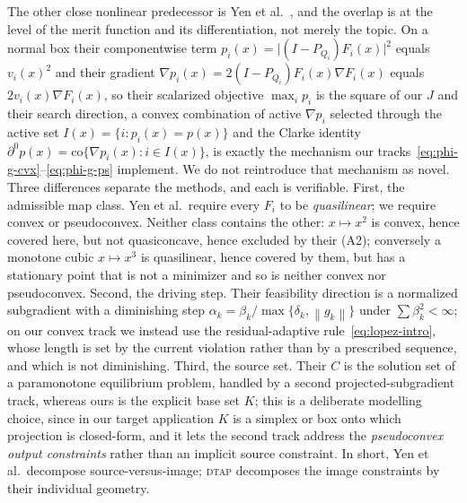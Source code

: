 \documentclass[]{interact}
\theoremstyle{plain}
\theoremstyle{definition}
\theoremstyle{remark}
\newcommand{\norm}[1]{\left\lVert #1 \right\rVert}
\newcommand{\dtap}{\textsc{dtap}}
\begin{document}
The other close nonlinear predecessor is Yen et al.~\citep{yen2019}, and the overlap is at the
level of the merit function and its differentiation, not merely the topic. On a normal box their
componentwise term $p_i(x)=\lvert(I-P_{Q_i})F_i(x)\rvert^2$ equals $v_i(x)^2$ and their gradient
$\nabla p_i(x)=2(I-P_{Q_i})F_i(x)\nabla F_i(x)$ equals $2v_i(x)\nabla F_i(x)$, so their scalarized
objective $\max_i p_i$ is the square of our $J$ and their search direction, a convex combination
of active $\nabla p_i$ selected through the active set $I(x)=\{i:p_i(x)=p(x)\}$ and the Clarke
identity $\partial^0 p(x)=\mathrm{co}\{\nabla p_i(x):i\in I(x)\}$, is exactly the mechanism our
tracks~\eqref{eq:phi-g-cvx}--\eqref{eq:phi-g-ps} implement. We do not reintroduce that mechanism as
novel. Three differences separate the methods, and each is verifiable. First, the admissible map
class. Yen et al.\ require every $F_i$ to be \emph{quasilinear}; we require convex or
pseudoconvex. Neither class contains the other: $x\mapsto x^2$ is convex, hence covered here, but
not quasiconcave, hence excluded by their (A2); conversely a monotone cubic $x\mapsto x^3$ is
quasilinear, hence covered by them, but has a stationary point that is not a minimizer and so is
neither convex nor pseudoconvex. Second, the driving step. Their feasibility direction is a
normalized subgradient with a diminishing step $\alpha_k=\beta_k/\max\{\delta_k,\norm{g_k}\}$
under $\sum\beta_k^2<\infty$; on our convex track we instead use the residual-adaptive
rule~\eqref{eq:lopez-intro}, whose length is set by the current violation rather than by a
prescribed sequence, and which is not diminishing. Third, the source set. Their $C$ is the
solution set of a paramonotone equilibrium problem, handled by a second projected-subgradient
track, whereas ours is the explicit base set $K$; this is a deliberate modelling choice, since in
our target application $K$ is a simplex or box onto which projection is closed-form, and it lets
the second track address the \emph{pseudoconvex output constraints} rather than an implicit source
constraint. In short, Yen et al.\ decompose source-versus-image; \dtap{} decomposes the image
constraints by their individual geometry.
\end{document}
